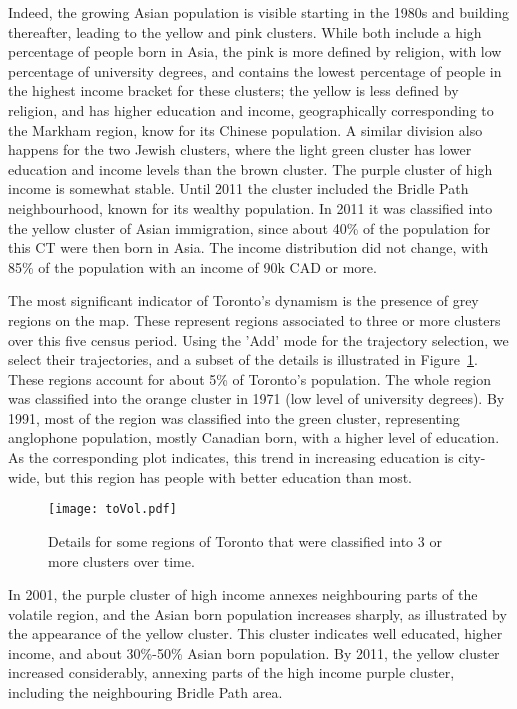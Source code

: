 Indeed, the growing Asian population is visible starting in the 1980s and
building thereafter, leading to the yellow and pink clusters. While both include
a high percentage of people born in Asia, the pink is more defined by religion,
with low percentage of university degrees, and contains the lowest percentage of
people in the highest income bracket for these clusters; the yellow is less
defined by religion, and has higher education and income, geographically
corresponding to the Markham region, know for its Chinese population. A similar
division also happens for the two Jewish clusters, where the light green cluster
has lower education and income levels than the brown cluster. The purple cluster
of high income is somewhat stable. Until 2011 the cluster included the Bridle
Path neighbourhood, known for its wealthy population. In 2011 it was classified
into the yellow cluster of Asian immigration, since about 40\% of the population
for this CT were then born in Asia. The income distribution did not change, with
85\% of the population with an income of 90k CAD or more.


The most significant indicator of Toronto's dynamism is the presence of grey
regions on the map. These represent regions associated to three or more clusters
over this five census period. Using the 'Add' mode for the trajectory selection,
we select their trajectories, and a subset of the details is illustrated in
Figure~\ref{fig:toVol}. These regions account for about 5\% of Toronto's
population. The whole region was classified into the orange cluster in 1971 (low
level of university degrees). By 1991, most of the region was classified into
the green cluster, representing anglophone population, mostly Canadian born,
with a higher level of education. As the corresponding plot indicates, this
trend in increasing education is city-wide, but this region has people with
better education than most.

\begin{figure}
    \centering 
    \texttt{[image: toVol.pdf]}
    \caption{Details for some regions of Toronto that were classified into 3 or
         more clusters over time.\label{fig:toVol}}
\end{figure}

In 2001, the purple cluster of high income annexes neighbouring parts of the
volatile region, and the Asian born population increases sharply, as illustrated
by the appearance of the yellow cluster.  This cluster indicates well educated,
higher income, and about 30\%-50\% Asian born population. By 2011, the yellow
cluster increased considerably, annexing parts of the high income purple
cluster, including the neighbouring Bridle Path area.

